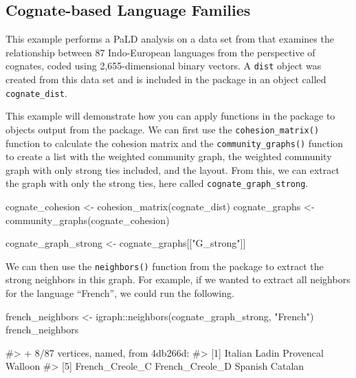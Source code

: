\hypertarget{cognate-based-language-families}{%
\subsection{Cognate-based Language
Families}\label{cognate-based-language-families}}

This example performs a PaLD analysis on a data set from \citet{dyen92}
that examines the relationship between 87 Indo-European languages from
the perspective of cognates, coded using 2,655-dimensional binary
vectors. A \texttt{dist} object was created from this data set and is
included in the  package in an object called
\texttt{cognate\_dist}.

This example will demonstrate how you can apply functions in the
 package to objects output from the 
package. We can first use the \texttt{cohesion\_matrix()} function to
calculate the cohesion matrix and the \texttt{community\_graphs()}
function to create a list with the weighted community graph, the
weighted community graph with only strong ties included, and the layout.
From this, we can extract the graph with only the strong ties, here
called \texttt{cognate\_graph\_strong}.

\begin{Schunk}
\begin{Sinput}
cognate_cohesion <- cohesion_matrix(cognate_dist)
cognate_graphs <- community_graphs(cognate_cohesion)

cognate_graph_strong <- cognate_graphs[["G_strong"]]
\end{Sinput}
\end{Schunk}

We can then use the \texttt{neighbors()} function from the
 package to extract the strong neighbors in this graph.
For example, if we wanted to extract all neighbors for the language
``French'', we could run the following.

\begin{Schunk}
\begin{Sinput}
french_neighbors <- igraph::neighbors(cognate_graph_strong, "French")
french_neighbors
\end{Sinput}
\begin{Soutput}
#> + 8/87 vertices, named, from 4db266d:
#> [1] Italian         Ladin           Provencal       Walloon        
#> [5] French_Creole_C French_Creole_D Spanish         Catalan
\end{Soutput}
\end{Schunk}

